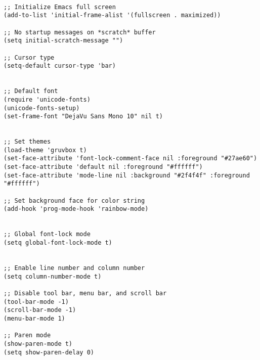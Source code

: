 \documentclass[11pt]{article}
\begin{document}
\begin{verbatim}

;; Initialize Emacs full screen 
(add-to-list 'initial-frame-alist '(fullscreen . maximized))

;; No startup messages on *scratch* buffer
(setq initial-scratch-message "")

;; Cursor type
(setq-default cursor-type 'bar)


;; Default font
(require 'unicode-fonts)
(unicode-fonts-setup)
(set-frame-font "DejaVu Sans Mono 10" nil t)


;; Set themes
(load-theme 'gruvbox t)
(set-face-attribute 'font-lock-comment-face nil :foreground "#27ae60")
(set-face-attribute 'default nil :foreground "#ffffff")
(set-face-attribute 'mode-line nil :background "#2f4f4f" :foreground "#ffffff")

;; Set background face for color string
(add-hook 'prog-mode-hook 'rainbow-mode)


;; Global font-lock mode
(setq global-font-lock-mode t)


;; Enable line number and column number
(setq column-number-mode t)

;; Disable tool bar, menu bar, and scroll bar
(tool-bar-mode -1)
(scroll-bar-mode -1)
(menu-bar-mode 1)

;; Paren mode
(show-paren-mode t)
(setq show-paren-delay 0)


\end{verbatim}
\end{document}
